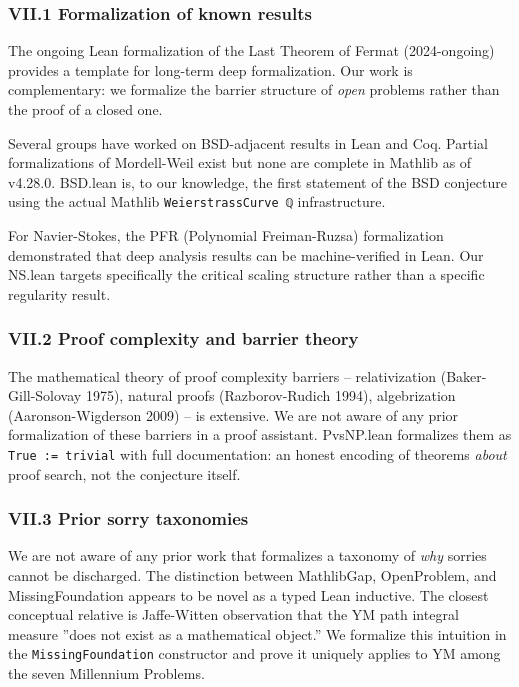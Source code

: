 \documentclass[12pt,a4paper]{article}
\begin{document}
\subsubsection{VII.1 Formalization of known results}

The ongoing Lean formalization of the Last Theorem of Fermat (2024-ongoing) provides a template for long-term deep formalization. Our work is complementary: we formalize the barrier structure of \emph{open} problems rather than the proof of a closed one.

Several groups have worked on BSD-adjacent results in Lean and Coq. Partial formalizations of Mordell-Weil exist but none are complete in Mathlib as of v4.28.0. BSD.lean is, to our knowledge, the first statement of the BSD conjecture using the actual Mathlib \texttt{WeierstrassCurve ℚ} infrastructure.

For Navier-Stokes, the PFR (Polynomial Freiman-Ruzsa) formalization demonstrated that deep analysis results can be machine-verified in Lean. Our NS.lean targets specifically the critical scaling structure rather than a specific regularity result.

\subsubsection{VII.2 Proof complexity and barrier theory}

The mathematical theory of proof complexity barriers  --  relativization (Baker-Gill-Solovay 1975), natural proofs (Razborov-Rudich 1994), algebrization (Aaronson-Wigderson 2009)  --  is extensive. We are not aware of any prior formalization of these barriers in a proof assistant. PvsNP.lean formalizes them as \texttt{True := trivial} with full documentation: an honest encoding of theorems \emph{about} proof search, not the conjecture itself.

\subsubsection{VII.3 Prior sorry taxonomies}

We are not aware of any prior work that formalizes a taxonomy of \emph{why} sorries cannot be discharged. The distinction between MathlibGap, OpenProblem, and MissingFoundation appears to be novel as a typed Lean inductive. The closest conceptual relative is Jaffe-Witten observation that the YM path integral measure ''does not exist as a mathematical object.'' We formalize this intuition in the \texttt{MissingFoundation} constructor and prove it uniquely applies to YM among the seven Millennium Problems.
\end{document}
